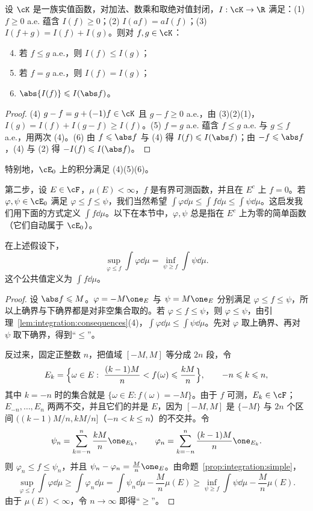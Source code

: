 \begin{lemma}\label{lem:integration:consequences}
设 $\cK$ 是一族实值函数，对加法、数乘和取绝对值封闭，$I:\cK\to\R$ 满足：(1) $f\geqslant0$ a.e. 蕴含 $I(f)\geqslant0$；(2) $I(af)=aI(f)$；(3) $I(f+g)=I(f)+I(g)$。则对 $f,g\in\cK$：
\begin{enumerate}
\setcounter{enumi}{3}
\item 若 $f\leqslant g$ a.e.，则 $I(f)\leqslant I(g)$；
\item 若 $f=g$ a.e.，则 $I(f)=I(g)$；
\item $\abs{I(f)}\leqslant I(\abs f)$。
\end{enumerate}
\end{lemma}
\begin{proof}
(4) $g-f=g+(-1)f\in\cK$ 且 $g-f\geqslant0$ a.e.，由 (3)(2)(1)，$I(g)=I(f)+I(g-f)\geqslant I(f)$。(5) $f=g$ a.e. 蕴含 $f\leqslant g$ a.e. 与 $g\leqslant f$ a.e.，用两次 (4)。(6) 由 $f\leqslant\abs f$ 与 (4) 得 $I(f)\leqslant I(\abs f)$；由 $-f\leqslant\abs f$，(4) 与 (2) 得 $-I(f)\leqslant I(\abs f)$。
\end{proof}

特别地，$\cE_0$ 上的积分满足 (4)(5)(6)。


第二步，设 $E\in\cF$，$\mu(E)<\infty$，$f$ 是有界可测函数，并且在 $E^c$ 上 $f=0$。若 $\varphi,\psi\in\cE_0$ 满足 $\varphi\leqslant f\leqslant\psi$，我们当然希望 $\int\varphi\dd\mu\leqslant\int f\dd\mu\leqslant\int\psi\dd\mu$。这启发我们用下面的方式定义 $\int f\dd\mu$。以下在本节中，$\varphi,\psi$ 总是指在 $E^c$ 上为零的简单函数（它们自动属于 $\cE_0$）。

\begin{theorem}\label{thm:integration:bounded}
在上述假设下，
\[
\sup_{\varphi\leqslant f}\int\varphi\dd\mu=\inf_{\psi\geqslant f}\int\psi\dd\mu .
\]
这个公共值定义为 $\int f\dd\mu$。
\end{theorem}
\begin{proof}
设 $\abs f\leqslant M$。$\varphi=-M\one_E$ 与 $\psi=M\one_E$ 分别满足 $\varphi\leqslant f\leqslant\psi$，所以上确界与下确界都是对非空集合取的。若 $\varphi\leqslant f\leqslant\psi$，则 $\varphi\leqslant\psi$，由引理~\ref{lem:integration:consequences}(4)，$\int\varphi\dd\mu\leqslant\int\psi\dd\mu$。先对 $\varphi$ 取上确界、再对 $\psi$ 取下确界，得到“$\leqslant$”。

反过来，固定正整数 $n$，把值域 $[-M,M]$ 等分成 $2n$ 段，令
\[
E_k=\Bigl\{\omega\in E:\ \frac{(k-1)M}n<f(\omega)\leqslant\frac{kM}n\Bigr\},\qquad -n\leqslant k\leqslant n,
\]
其中 $k=-n$ 时的集合就是 $\{\omega\in E: f(\omega)=-M\}$。由于 $f$ 可测，$E_k\in\cF$；$E_{-n},\dots,E_n$ 两两不交，并且它们的并是 $E$，因为 $[-M,M]$ 是 $\{-M\}$ 与 $2n$ 个区间 $((k-1)M/n,kM/n]$（$-n<k\leqslant n$）的不交并。令
\[
\psi_n=\sum_{k=-n}^n\frac{kM}n\one_{E_k},\qquad \varphi_n=\sum_{k=-n}^n\frac{(k-1)M}n\one_{E_k}.
\]
则 $\varphi_n\leqslant f\leqslant\psi_n$，并且 $\psi_n-\varphi_n=\frac Mn\one_E$。由命题~\ref{prop:integration:simple}，
\[
\sup_{\varphi\leqslant f}\int\varphi\dd\mu\geqslant\int\varphi_n\dd\mu=\int\psi_n\dd\mu-\frac Mn\mu(E)\geqslant\inf_{\psi\geqslant f}\int\psi\dd\mu-\frac Mn\mu(E).
\]
由于 $\mu(E)<\infty$，令 $n\to\infty$ 即得“$\geqslant$”。
\end{proof}

